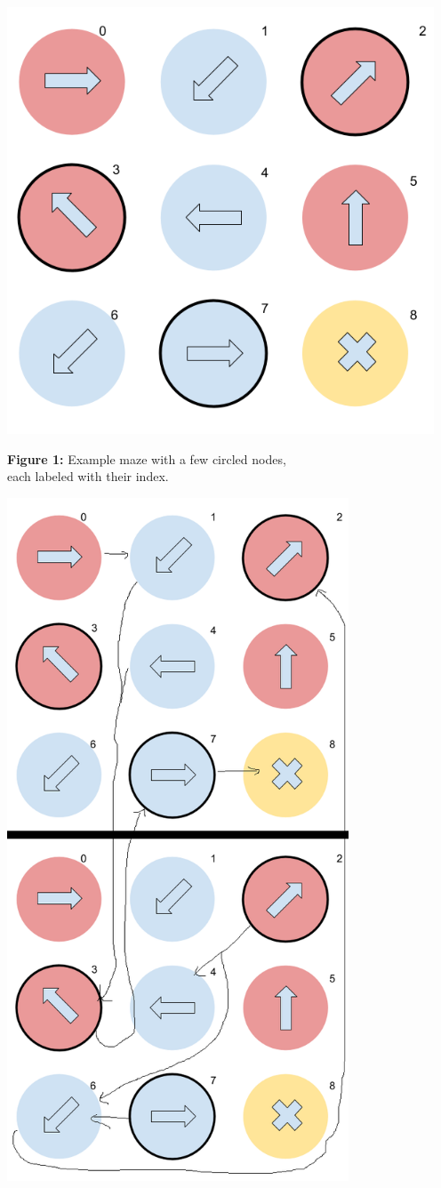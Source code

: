 \documentclass[12pt]{article}
\begin{document}
\begin{center}
    \includegraphics[width=5in]{examplemaze.png}

    \textbf{Figure 1:} Example maze with a few circled nodes,\\
    each labeled with their index.

    \includegraphics[width=4in]{graphs.png}


\end{center}
\end{document}
